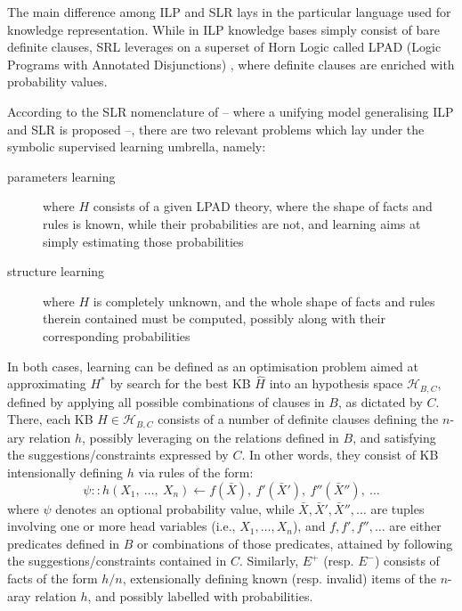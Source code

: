 \documentclass[12pt,a4paper,openright,twoside]{book}
\begin{document}
The main difference among ILP and SLR lays in the particular language used for knowledge representation.
%
While in ILP knowledge bases simply consist of bare definite clauses, SRL leverages on a superset of Horn Logic called LPAD (Logic Programs with Annotated Disjunctions) \cite{VennekensVB04}, where definite clauses are enriched with probability values.

According to the SLR nomenclature of \cite{DeRaedt2010} -- where a unifying model generalising ILP and SLR is proposed --, there are two relevant problems which lay under the symbolic supervised learning umbrella, namely:
%
\begin{description}
    \item[parameters learning] where $H$ consists of a given LPAD theory, where the shape of facts and rules is known, while their probabilities are not, and learning aims at simply estimating those probabilities

    \item[structure learning] where $H$ is completely unknown, and the whole shape of facts and rules therein contained must be computed, possibly along with their corresponding probabilities
\end{description}

In both cases, learning can be defined as an optimisation problem aimed at approximating $H^*$ by search for the best KB $\hat{H}$ into an hypothesis space $\mathcal{H}_{B,C}$, defined by applying all possible combinations of clauses in $B$, as dictated by $C$.
%
There, each KB $H \in \mathcal{H}_{B,C}$ consists of a number of definite clauses defining the $n$-ary relation $h$, possibly leveraging on the relations defined in $B$, and satisfying the suggestions/constraints expressed by $C$.
%
In other words, they consist of KB intensionally defining $h$ via rules of the form:
%
\begin{equation*}
    \psi :: h(X_1,\ \ldots,\ X_n) \leftarrow f(\bar{X}),\ f'(\bar{X}'),\ f''(\bar{X}''),\ \ldots
\end{equation*}
%
where $\psi$ denotes an optional probability value,  while $\bar{X}, \bar{X}', \bar{X}'', \ldots$ are tuples involving one or more head variables (i.e., $X_1, \ldots, X_n$), and $f, f', f'', \ldots$ are either predicates defined in $B$ or combinations of those predicates, attained by following the suggestions/constraints contained in $C$.
%
Similarly, $E^+$ (resp. $E^-$) consists of facts of the form $h/n$, extensionally defining known (resp. invalid) items of the $n$-aray relation $h$, and possibly labelled with probabilities.
\end{document}
